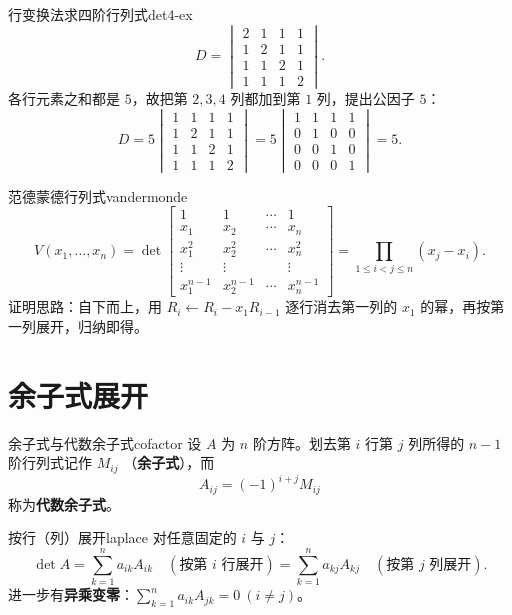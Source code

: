 \documentclass[11pt,a4paper,openany]{ctexbook}
\begin{document}
\begin{exmp}{行变换法求四阶行列式}{det4-ex}
\[
D=\begin{vmatrix}
2 & 1 & 1 & 1\\
1 & 2 & 1 & 1\\
1 & 1 & 2 & 1\\
1 & 1 & 1 & 2
\end{vmatrix}.
\]
各行元素之和都是 $5$，故把第 $2,3,4$ 列都加到第 $1$ 列，提出公因子 $5$：
\[
D=5\begin{vmatrix}1&1&1&1\\1&2&1&1\\1&1&2&1\\1&1&1&2\end{vmatrix}
=5\begin{vmatrix}1&1&1&1\\0&1&0&0\\0&0&1&0\\0&0&0&1\end{vmatrix}=5.
\]
\end{exmp}

\begin{exmp}{范德蒙德行列式}{vandermonde}
\[
V(x_1,\dots,x_n)=\det
\begin{bmatrix}
1 & 1 & \cdots & 1\\
x_1 & x_2 & \cdots & x_n\\
x_1^2 & x_2^2 & \cdots & x_n^2\\
\vdots & \vdots & & \vdots\\
x_1^{n-1} & x_2^{n-1} & \cdots & x_n^{n-1}
\end{bmatrix}
=\prod_{1\le i<j\le n}(x_j-x_i).
\]
证明思路：自下而上，用 $R_i\leftarrow R_i-x_1R_{i-1}$ 逐行消去第一列的
$x_1$ 的幂，再按第一列展开，归纳即得。
\end{exmp}

\section{余子式展开}

\begin{defn}{余子式与代数余子式}{cofactor}
设 $A$ 为 $n$ 阶方阵。划去第 $i$ 行第 $j$ 列所得的 $n-1$ 阶行列式记作 $M_{ij}$
（\textbf{余子式}），而
\[
A_{ij}=(-1)^{i+j}M_{ij}
\]
称为\textbf{代数余子式}。
\end{defn}

\begin{thm}{按行（列）展开}{laplace}
对任意固定的 $i$ 与 $j$：
\[
\det A=\sum_{k=1}^{n}a_{ik}A_{ik}\quad(\text{按第 }i\text{ 行展开})
=\sum_{k=1}^{n}a_{kj}A_{kj}\quad(\text{按第 }j\text{ 列展开}).
\]
进一步有\textbf{异乘变零}：$\sum_{k=1}^{n}a_{ik}A_{jk}=0\ (i\neq j)$。
\end{thm}
\end{document}
